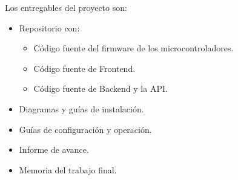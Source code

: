 Los entregables del proyecto son:
\begin{itemize}
	\item Repositorio con:
	      \begin{itemize}
		      \item Código fuente del firmware de los microcontroladores.
		      \item Código fuente de Frontend.
		      \item Código fuente de Backend y la API.
	      \end{itemize}
	\item Diagramas y guías de instalación.
	\item Guías de configuración y operación.
	\item Informe de avance.
	\item Memoria del trabajo final.
\end{itemize}